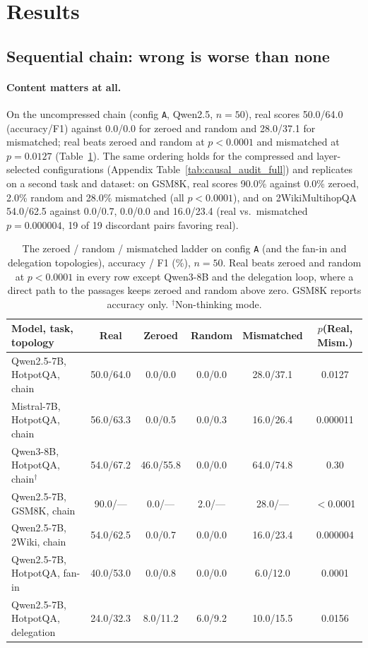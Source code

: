 \documentclass[11pt]{article}
\begin{document}
\section{Results}
\label{sec:results}

\subsection{Sequential chain: wrong is worse than none}

\paragraph{Content matters at all.} On the uncompressed chain
(config \texttt{A}, Qwen2.5, $n{=}50$), real scores 50.0/64.0
(accuracy/F1) against 0.0/0.0 for zeroed and random and 28.0/37.1 for
mismatched; real beats zeroed and random at $p<0.0001$ and mismatched at
$p=0.0127$ (Table~\ref{tab:ladder}). The same ordering holds for the
compressed and layer-selected configurations (Appendix
Table~\ref{tab:causal_audit_full}) and replicates on a second task and
dataset: on GSM8K, real scores 90.0\% against 0.0\% zeroed, 2.0\% random and
28.0\% mismatched (all $p<0.0001$), and on 2WikiMultihopQA 54.0/62.5 against
0.0/0.7, 0.0/0.0 and 16.0/23.4 (real vs.\ mismatched $p=0.000004$, 19 of 19
discordant pairs favoring real).

\begin{table}[t]
\centering
\small
\caption{The zeroed / random / mismatched ladder on config \texttt{A} (and the
fan-in and delegation topologies), accuracy / F1 (\%), $n{=}50$. Real beats
zeroed and random at $p<0.0001$ in every row except Qwen3-8B and the
delegation loop, where a direct path to the passages keeps zeroed and random
above zero. GSM8K reports accuracy only. $^\dagger$Non-thinking mode.}
\label{tab:ladder}
\begin{tabular}{lccccc}
\toprule
\textbf{Model, task, topology} & \textcolor{realblue}{\textbf{Real}} & \textbf{Zeroed} & \textbf{Random} & \textcolor{wrongred}{\textbf{Mismatched}} & $p$(Real, Mism.) \\
\midrule
Qwen2.5-7B, HotpotQA, chain       & 50.0/64.0 & 0.0/0.0   & 0.0/0.0 & 28.0/37.1 & 0.0127 \\
Mistral-7B, HotpotQA, chain       & 56.0/63.3 & 0.0/0.5   & 0.0/0.3 & 16.0/26.4 & 0.000011 \\
Qwen3-8B, HotpotQA, chain$^\dagger$ & 54.0/67.2 & 46.0/55.8 & 0.0/0.0 & 64.0/74.8 & 0.30 \\
Qwen2.5-7B, GSM8K, chain          & 90.0/--- & 0.0/---   & 2.0/--- & 28.0/---  & $<$0.0001 \\
Qwen2.5-7B, 2Wiki, chain          & 54.0/62.5 & 0.0/0.7   & 0.0/0.0 & 16.0/23.4 & 0.000004 \\
Qwen2.5-7B, HotpotQA, fan-in      & 40.0/53.0 & 0.0/0.8   & 0.0/0.0 & 6.0/12.0  & 0.0001 \\
Qwen2.5-7B, HotpotQA, delegation  & 24.0/32.3 & 8.0/11.2  & 6.0/9.2 & 10.0/15.5 & 0.0156 \\
\bottomrule
\end{tabular}
\end{table}
\end{document}
